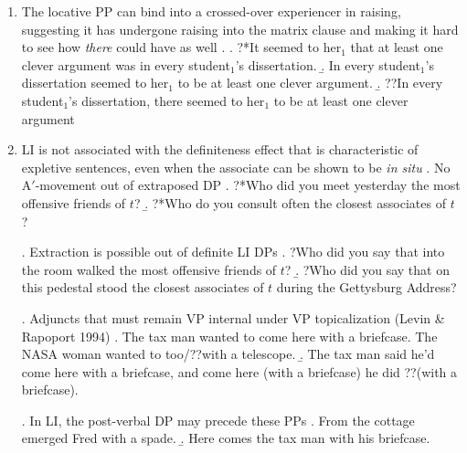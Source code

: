 \documentclass[letterpaper,10pt]{handout_nick}
\begin{document}
\begin{itemize}
\begin{enumerate}
\item The locative PP can bind into a crossed-over experiencer in raising, suggesting it has undergone raising into the matrix clause and making it hard to see how \emph{there} could have as well
\ex. \a. ?*It seemed to her$_1$ that at least one clever argument was in every student$_1$'s dissertation.
\b. In every student$_1$'s dissertation seemed to her$_1$ to be at least one clever argument.
\b. ??In every student$_1$'s dissertation, there seemed to her$_1$ to be at least one clever argument

\item LI is not associated with the definiteness effect that is characteristic of expletive sentences, even when the associate can be shown to be \emph{in situ}
\ex. No A$'$-movement out of extraposed DP
\a. ?*Who did you meet yesterday the most offensive friends of $t$?
\b. ?*Who do you consult often the closest associates of $t$?

\ex. Extraction is possible out of definite LI DPs
\a. ?Who did you say that into the room walked the most offensive friends of $t$?
\b. ?Who did you say that on this pedestal stood the closest associates of $t$ during the Gettysburg Address? 

\ex. Adjuncts that must remain VP internal under VP topicalization (Levin \& Rapoport 1994)
\a. The tax man wanted to come here with a briefcase. The NASA woman wanted to too/??with a telescope.
\b. The tax man said he'd come here with a briefcase, and come here (with a briefcase) he did ??(with a briefcase). 

\ex. In LI, the post-verbal DP may precede these PPs
\a. From the cottage emerged Fred with a spade.
\b. Here comes the tax man with his briefcase.



\end{enumerate}
\end{itemize}
\end{document}

